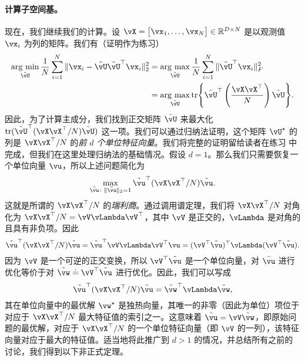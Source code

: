 \documentclass[../../book-main.tex]{subfiles}
\begin{document}
\paragraph{计算子空间基。}
现在，我们继续我们的计算。设 \(\vX = \mat{\vx_{1}, \dots, \vx_{N}} \in \R^{D \times N}\) 是以观测值 \(\vx_{i}\) 为列的矩阵。我们有（证明作为练习）
\begin{align}
    \argmin_{\tilde{\vU}}\frac{1}{N}\sum_{i = 1}^{N}\norm{\vx_{i} - \tilde{\vU}\tilde{\vU}^{\top}\vx_{i}}_{2}^{2}
    &= \argmax_{\tilde{\vU}}\frac{1}{N}\sum_{i = 1}^{N}\norm{\tilde{\vU}^{\top}\vx_{i}}_{F}^{2} \\ 
    &= \argmax_{\tilde{\vU}}\tr\rc{\tilde{\vU}^{\top}\bp{\frac{\vX\vX^{\top}}{N}}\tilde{\vU}}.
\end{align}
因此，为了计算主成分，我们找到正交矩阵 \(\tilde{\vU}\) 来最大化 \(\tr(\tilde{\vU}^{\top}(\vX\vX^{\top}/N)\tilde{\vU})\) 这一项。我们可以通过归纳法证明，这个矩阵 \(\vU^{\star}\) 的列是 \(\vX\vX^{\top}/N\) 的\textit{前 \(d\) 个单位特征向量}。我们将完整的证明留给读者在练习  中完成，但我们在这里处理归纳法的基础情况。假设 \(d = 1\)。那么我们只需要恢复一个单位向量 \(\vu\)，所以上述问题简化为
\begin{equation}
    \max_{\tilde{\vu} \colon \norm{\tilde{\vu}}_{2} = 1} \tilde{\vu}^{\top}(\vX\vX^{\top}/N)\tilde{\vu}.
\end{equation}
这就是所谓的 \(\vX\vX^{\top}/N\) 的\textit{瑞利商}。通过调用谱定理，我们将 \(\vX\vX^{\top}/N\) 对角化为 \(\vX\vX^{\top}/N = \vV\vLambda\vV^{\top}\)，其中 \(\vV\) 是正交的，\(\vLambda\) 是对角的且具有非负项。因此
\begin{equation}
    \tilde{\vu}^{\top}(\vX\vX^{\top}/N)\tilde{\vu} = \tilde{\vu}^{\top}\vV\vLambda\vV^{\top}\vu = (\vV^{\top}\tilde{\vu})^{\top}\vLambda(\vV^{\top}\tilde{\vu}).
\end{equation}
因为 \(\vV\) 是一个可逆的正交变换，所以 \(\vV^{\top}\tilde{\vu}\) 是一个单位向量，对 \(\tilde{\vu}\) 进行优化等价于对 \(\tilde{\vw} \doteq \vV^{\top}\tilde{\vu}\) 进行优化。因此，我们可以写成
\begin{equation}
    \tilde{\vu}^{\top}(\vX\vX^{\top}/N)\tilde{\vu} = \tilde{\vw}^{\top}\vLambda\tilde{\vw},
\end{equation}
其在单位向量中的最优解 \(\vw^{\star}\) 是独热向量，其唯一的非零（因此为单位）项位于对应于 \(\vX\vX^{\top}/N\) 最大特征值的索引之一。这意味着 \(\tilde{\vu} = \vV\tilde{\vw}\)，即原始问题的最优解，对应于 \(\vX\vX^{\top}/N\) 的一个单位特征向量（即 \(\vV\) 的一列），该特征向量对应于最大的特征值。适当地将此推广到 \(d > 1\) 的情况，并总结所有之前的讨论，我们得到以下非正式定理。
\end{document}
